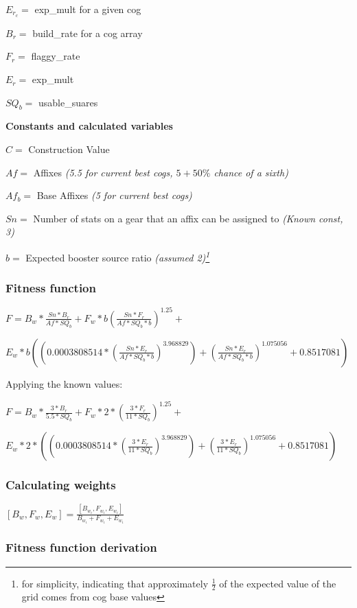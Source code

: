 \documentclass[12pt, letterpaper]{article}
\begin{document}
$E_{r_c} =$ exp\_mult for a given cog

$B_r =$ build\_rate for a cog array

$F_r =$ flaggy\_rate

$E_r =$ exp\_mult

$SQ_b =$ usable\_suares

\textbf{Constants and calculated variables}

$C =$ Construction Value

$Af =$ Affixes \textit{(5.5 for current best cogs, $5+50\%$ chance of a sixth)}

$Af_b =$ Base Affixes \textit{(5 for current best cogs)}

$Sn =$ Number of stats on a gear that an affix can be assigned to \textit{(Known const, 3)}

$b =$ Expected booster source ratio \textit{(assumed 2)\footnote{for simplicity, indicating that approximately $\frac{1}{2}$ of the expected value of the grid comes from cog base values}}

\subsubsection{Fitness function}

$F = B_w*\frac{Sn*B_r}{Af*SQ_b}+F_w*b\left(\frac{Sn*F_r}{Af*SQ_b*b}\right)^{1.25}+$

$E_w*b\left(\left(0.0003808514*\left(\frac{Sn*E_r}{Af*SQ_b*b}\right)^{3.968829}\right)+\left(\frac{Sn*E_r}{Af*SQ_b*b}\right)^{1.075056}+0.8517081\right)$

Applying the known values:


$F = B_w*\frac{3*B_r}{5.5*SQ_b}+F_w*2*\left(\frac{3*F_r}{11*SQ_b}\right)^{1.25}+$

$E_w*2*\left(\left(0.0003808514*\left(\frac{3*E_r}{11*SQ_b}\right)^{3.968829}\right)+\left(\frac{3*E_r}{11*SQ_b}\right)^{1.075056}+0.8517081\right)$

\subsubsection{Calculating weights}

$[B_w,F_w,E_w] = \frac{[B_{w_i}, F_{w_i}, E_{w_i}]}{B_{w_i} + F_{w_i} + E_{w_i}}$

\subsubsection{Fitness function derivation}
\end{document}
